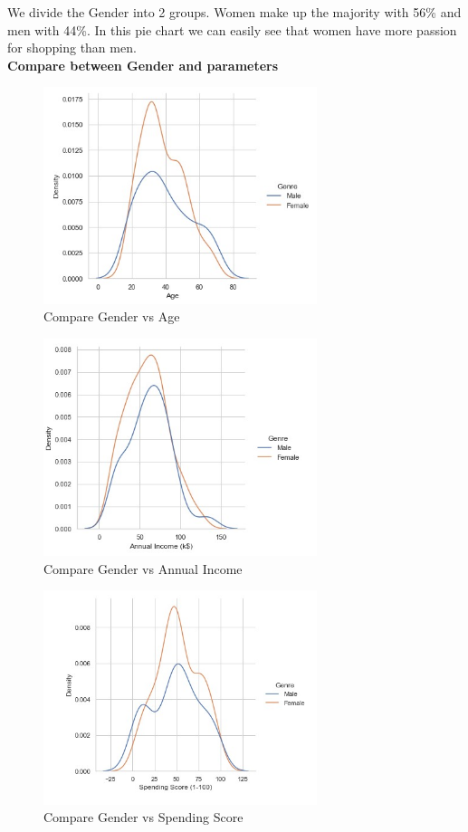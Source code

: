 \documentclass{article}
\begin{document}
We divide the Gender into 2 groups. Women make up the majority with 56\% and men with 44\%. In this pie chart we can easily see that women have more passion for shopping than men.\\

\vspace{2cm}
\textbf{Compare between Gender and parameters}

\begin{figure}[htp]
    \centering
    \includegraphics[width=8cm]{Gender vs Age.jpg}
    \caption{Compare Gender vs Age}
    \label{fig:Compare Gender vs Age}
\end{figure}


\begin{figure}[htp]
    \centering
    \includegraphics[width=8cm]{Gender vs Annual Income.jpg}
    \caption{Compare Gender vs Annual Income}
    \label{fig:Compare Gender vs Annual Income}
\end{figure}

\begin{figure}[htp]
    \centering
    \includegraphics[width=8cm]{Gender vs Spending Score.jpg}
    \caption{Compare Gender vs Spending Score}
    \label{fig:Compare Gender vs Spending Score}
\end{figure}
\end{document}

